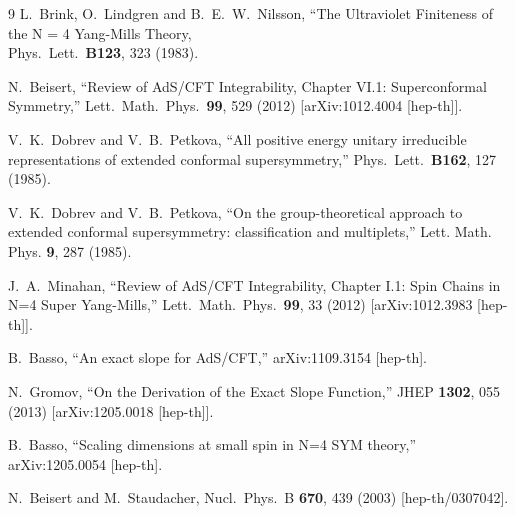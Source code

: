 \documentclass[a4paper]{article}
\numberwithin{equation}{section}
\begin{document}
\begin{thebibliography} {9}
	L.~Brink, O.~Lindgren and B.~E.~W.~Nilsson,
	``The Ultraviolet Finiteness of the N = 4 Yang-Mills Theory,\\
	Phys.\ Lett.\ {\bf B123}, 323 (1983).

  N.~Beisert,
  ``Review of AdS/CFT Integrability, Chapter VI.1: Superconformal Symmetry,''
  Lett.\ Math.\ Phys.\  {\bf 99}, 529 (2012)
  [arXiv:1012.4004 [hep-th]].
  
	V.~K.~Dobrev and V.~B.~Petkova, 
	``All positive energy unitary irreducible representations of extended conformal supersymmetry,''
	Phys.\ Lett.\ {\bf B162}, 127 (1985).

	V.~K.~Dobrev and V.~B.~Petkova,
	``On the group-theoretical approach to extended conformal supersymmetry: classification and multiplets,''
	Lett. Math. Phys. {\bf 9}, 287 (1985).
	
  J.~A.~Minahan,
  ``Review of AdS/CFT Integrability, Chapter I.1: Spin Chains in N=4 Super Yang-Mills,''
  Lett.\ Math.\ Phys.\  {\bf 99}, 33 (2012)
  [arXiv:1012.3983 [hep-th]].
 
  B.~Basso,
  ``An exact slope for AdS/CFT,''
  arXiv:1109.3154 [hep-th].
  
  N.~Gromov,
  ``On the Derivation of the Exact Slope Function,''
  JHEP {\bf 1302}, 055 (2013)
  [arXiv:1205.0018 [hep-th]].
  
  B.~Basso,
  ``Scaling dimensions at small spin in N=4 SYM theory,''
  arXiv:1205.0054 [hep-th].
  
  N.~Beisert and M.~Staudacher,
  Nucl.\ Phys.\ B {\bf 670}, 439 (2003)
  [hep-th/0307042].
  
  
\end{thebibliography}
  
\end{document}
